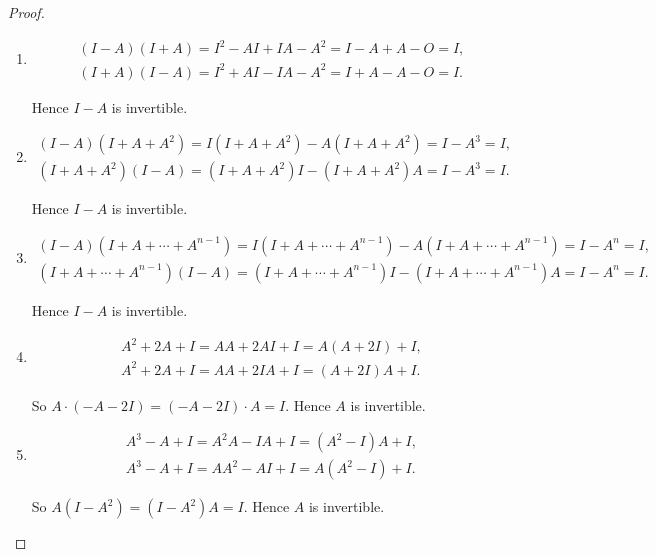 \begin{proof}
    \begin{enumerate}[label={(\alph*)}]
        \item
              \[
                  \begin{split}
                      (I - A)(I + A) = I^{2} - AI + IA - A^{2} = I - A + A - O = I, \\
                      (I + A)(I - A) = I^{2} + AI - IA - A^{2} = I + A - A - O = I.
                  \end{split}
              \]

              Hence $I - A$ is invertible.
        \item
              \[
                  \begin{split}
                      (I - A)(I + A + A^{2}) = I(I + A + A^{2}) - A(I + A + A^{2}) = I - A^{3} = I, \\
                      (I + A + A^{2})(I - A) = (I + A + A^{2})I - (I + A + A^{2})A = I - A^{3} = I.
                  \end{split}
              \]

              Hence $I - A$ is invertible.
        \item
              \[
                  \begin{split}
                      (I - A)(I + A + \cdots + A^{n-1}) = I(I + A + \cdots + A^{n-1}) - A(I + A + \cdots + A^{n-1}) = I - A^{n} = I, \\
                      (I + A + \cdots + A^{n-1})(I - A) = (I + A + \cdots + A^{n-1})I - (I + A + \cdots + A^{n-1})A = I - A^{n} = I.
                  \end{split}
              \]

              Hence $I - A$ is invertible.
        \item
              \[
                  \begin{split}
                      A^{2} + 2A + I = AA + 2AI + I = A(A + 2I) + I, \\
                      A^{2} + 2A + I = AA + 2IA + I = (A + 2I)A + I.
                  \end{split}
              \]

              So $A\cdot (-A-2I) = (-A-2I)\cdot A = I$. Hence $A$ is invertible.
        \item
              \[
                  \begin{split}
                      A^{3} - A + I = A^{2}A - IA + I = (A^{2} - I)A + I, \\
                      A^{3} - A + I = AA^{2} - AI + I = A(A^{2} - I) + I.
                  \end{split}
              \]

              So $A(I - A^{2}) = (I - A^{2})A = I$. Hence $A$ is invertible.
    \end{enumerate}
\end{proof}

